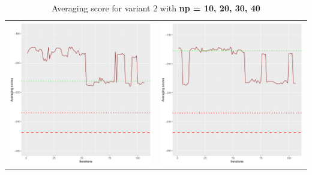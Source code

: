 \documentclass[]{scrartcl}
\begin{document}
\begin{table}[h!]
\begin{tabular}{cc}
\includegraphics[scale = 0.4]{./figs/asia/v2/30/avgBoundsEvolution-107.pdf} & 
\includegraphics[scale = 0.4]{./figs/asia/v2/40/avgBoundsEvolution-107.pdf} \\
\end{tabular}
\caption{Averaging score for variant 2 with \textbf{np =  10, 20, 30, 40}}
\end{table}
\end{document}
